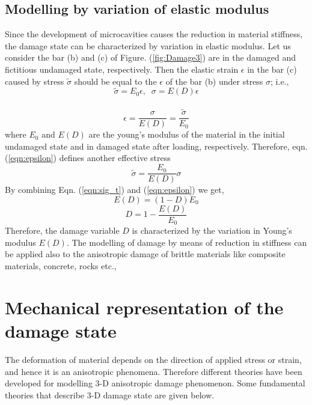 \documentclass[12pt]{report}
\begin{document}
\subsection{Modelling by variation of elastic modulus} 
\indent\indent\indent Since the development of microcavities causes the reduction in material stiffness, the damage state can be characterized by variation in elastic modulus. Let us consider the bar (b) and (c) of Figure. (\ref{fig:Damage3}) are in the damaged and fictitious undamaged state, respectively. Then the elastic strain $\epsilon$ in the bar (c) caused by stress $\tilde{\sigma}$ should be equal to the $\epsilon$ of the bar (b) under stress $\sigma$; i.e.,\\
\begin{equation}
\label{eqn:sig_t2}
   \tilde{\sigma} = E_{0}\epsilon, \;\;  \sigma = E(D)\epsilon 
\end{equation}
\\
\begin{equation}
\label{eqn:epsilon}
\epsilon = \frac{\sigma}{E(D)} = \frac{\tilde{\sigma}}{E_{0}}
\end{equation}
where $E_{0}$ and $E(D)$ are the young's modulus of the material in the initial undamaged state and in damaged state after loading, respectively. Therefore, eqn. (\ref{eqn:epsilon}) defines another effective stress\\
\begin{equation}
\label{eqn:epsilon2}
  \tilde{\sigma} = \frac{E_{0}}{E(D)}\sigma
\end{equation}
By combining Eqn. (\ref{eqn:sig_t}) and (\ref{eqn:epsilon}) we get,
\begin{equation}
\label{eqn:E(d)}
E(D) = (1 - D) E_{0}
\end{equation}
\begin{equation}
\label{eqn:D2}
D  = 1 - \frac{E(D)}{E_{0}}
\end{equation}
Therefore, the damage variable $D$ is characterized by the variation in Young's modulus $E(D)$. The modelling of damage by means of reduction in stiffness can be applied also to the anisotropic damage of brittle materials like composite materials, concrete, rocks etc.,
\section{Mechanical representation of the damage state}
\indent\indent\indent The deformation of material depends on the direction of applied stress or strain, and hence it is an anisotropic phenomena. Therefore different theories have been developed for modelling 3-D anisotropic damage phenomenon. Some fundamental theories that describe 3-D damage state are given below. 
\end{document}
